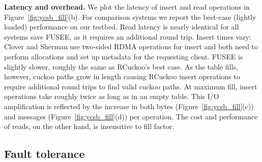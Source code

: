 \textbf{Latency and overhead.} We plot
the latency of insert and
read operations in Figure~\ref{fig:ycsb_fill}(b).  For comparison systems we report the 
best-case (lightly loaded) performance on our testbed.  Read latency is nearly identical for all systems save FUSEE,
as it requires an additional round trip. Insert times vary: Clover and Sherman use two-sided RDMA
operations for insert and both need to perform allocations and set up metadata for the requesting
client.  FUSEE is slightly slower, roughly the same as RCuckoo's best case.  As the table fills,
however, cuckoo paths grow in length causing RCuckoo insert operations to require additional round
trips to find valid cuckoo paths.  At maximum fill, insert operations take roughly twice as long as
in an empty table. This I/O amplification is reflected by the increase in both bytes
(Figure~\ref{fig:ycsb_fill}(c)) and messages (Figure~\ref{fig:ycsb_fill}(d)) per operation.  The cost and performance of reads,
on the other hand, is insensitive to fill factor.



\subsection{Fault tolerance}


